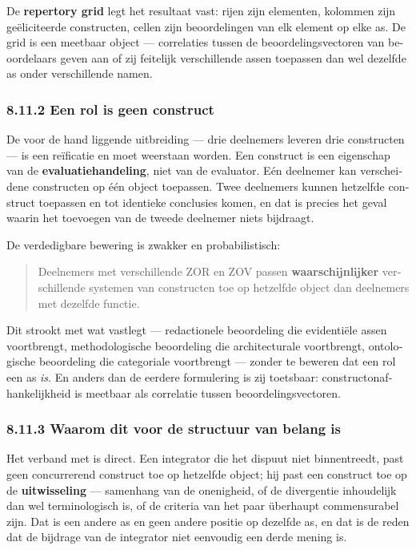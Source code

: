 \begin{dutch}
De \textbf{repertory grid} legt het resultaat vast: rijen zijn elementen, kolommen zijn geëliciteerde constructen, cellen zijn beoordelingen van elk element op elke as. De grid is een meetbaar object — correlaties tussen de beoordelingsvectoren van beoordelaars geven aan of zij feitelijk verschillende assen toepassen dan wel dezelfde as onder verschillende namen.


\subsubsection*{8.11.2 Een rol is geen construct}
\label{sec:nl:8.11.2}

De voor de hand liggende uitbreiding — drie deelnemers leveren drie constructen — is een reïficatie en moet weerstaan worden. Een construct is een eigenschap van de \textbf{evaluatiehandeling}, niet van de evaluator. Eén deelnemer kan verscheidene constructen op één object toepassen. Twee deelnemers kunnen hetzelfde construct toepassen en tot identieke conclusies komen, en dat is precies het geval waarin het toevoegen van de tweede deelnemer niets bijdraagt.

De verdedigbare bewering is zwakker en probabilistisch:

\begin{quote}
Deelnemers met verschillende ZOR en ZOV passen \textbf{waarschijnlijker} verschillende systemen van constructen toe op hetzelfde object dan deelnemers met dezelfde functie.
\end{quote}
Dit strookt met wat  vastlegt — redactionele beoordeling die evidentiële assen voortbrengt, methodologische beoordeling die architecturale voortbrengt, ontologische beoordeling die categoriale voortbrengt — zonder te beweren dat een rol een as \emph{is}. En anders dan de eerdere formulering is zij toetsbaar: constructonafhankelijkheid is meetbaar als correlatie tussen beoordelingsvectoren.


\subsubsection*{8.11.3 Waarom dit voor de structuur van belang is}
\label{sec:nl:8.11.3}

Het verband met  is direct. Een integrator die het dispuut niet binnentreedt, past geen concurrerend construct toe op hetzelfde object; hij past een construct toe op de \textbf{uitwisseling} — samenhang van de onenigheid, of de divergentie inhoudelijk dan wel terminologisch is, of de criteria van het paar überhaupt commensurabel zijn. Dat is een andere as en geen andere positie op dezelfde as, en dat is de reden dat de bijdrage van de integrator niet eenvoudig een derde mening is.


\end{dutch}
